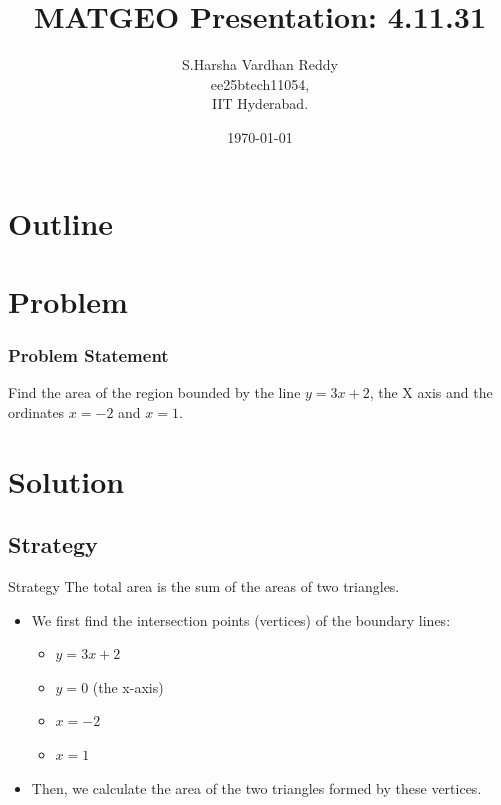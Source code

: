 \documentclass{beamer}
\title{MATGEO Presentation: 4.11.31}
\author{S.Harsha Vardhan Reddy \\ ee25btech11054,\\IIT Hyderabad.}
\date{\today}
\theoremstyle{remark}
\numberwithin{equation}{section}
\begin{document}
\begin{frame}
\titlepage
\end{frame}

\section*{Outline}
\begin{frame}
\tableofcontents
\end{frame}

\section{Problem}
\begin{frame}
\frametitle{Problem Statement}
Find the area of the region bounded by the line $y = 3x + 2$, the X axis and the ordinates $x = -2$ and $x = 1$.
\end{frame}

\section{Solution}
\subsection{Strategy}
\begin{frame}{Strategy}
The total area is the sum of the areas of two triangles. 
\begin{itemize}
    \item We first find the intersection points (vertices) of the boundary lines:
    \begin{itemize}
        \item $y = 3x + 2$
        \item $y = 0$ (the x-axis)
        \item $x = -2$
        \item $x = 1$
    \end{itemize}
    \item Then, we calculate the area of the two triangles formed by these vertices.
\end{itemize}
\end{frame}
\end{document}
